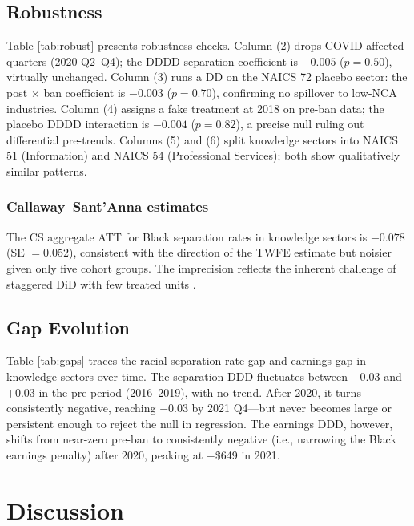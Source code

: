 \documentclass[12pt]{article}
\begin{document}
\subsection{Robustness}



Table \ref{tab:robust} presents robustness checks. Column (2) drops COVID-affected quarters (2020 Q2--Q4); the DDDD separation coefficient is $-0.005$ ($p = 0.50$), virtually unchanged. Column (3) runs a DD on the NAICS 72 placebo sector: the post $\times$ ban coefficient is $-0.003$ ($p = 0.70$), confirming no spillover to low-NCA industries. Column (4) assigns a fake treatment at 2018 on pre-ban data; the placebo DDDD interaction is $-0.004$ ($p = 0.82$), a precise null ruling out differential pre-trends. Columns (5) and (6) split knowledge sectors into NAICS 51 (Information) and NAICS 54 (Professional Services); both show qualitatively similar patterns.

\subsubsection*{Callaway--Sant'Anna estimates} The CS aggregate ATT for Black separation rates in knowledge sectors is $-0.078$ (SE $= 0.052$), consistent with the direction of the TWFE estimate but noisier given only five cohort groups. The imprecision reflects the inherent challenge of staggered DiD with few treated units \citep{mackinnon2022wild}.

\subsection{Gap Evolution}



Table \ref{tab:gaps} traces the racial separation-rate gap and earnings gap in knowledge sectors over time. The separation DDD fluctuates between $-0.03$ and $+0.03$ in the pre-period (2016--2019), with no trend. After 2020, it turns consistently negative, reaching $-0.03$ by 2021 Q4---but never becomes large or persistent enough to reject the null in regression. The earnings DDD, however, shifts from near-zero pre-ban to consistently negative (i.e., narrowing the Black earnings penalty) after 2020, peaking at $-$\$649 in 2021.

\section{Discussion}
\end{document}
